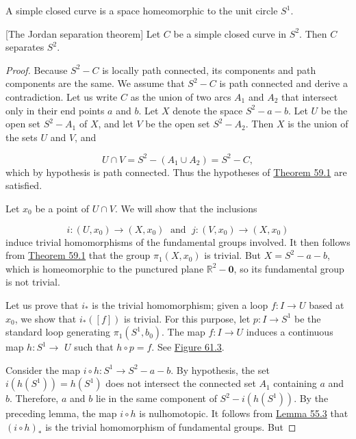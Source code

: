 A simple closed curve is a space homeomorphic to the unit circle \(S^{1}\).

\begin{theorem}
\label{thm:\thetheorem}[The Jordan separation theorem]
Let \(C\) be a simple closed curve in \(S^{2}\). Then \(C\) separates \(S^{2}\).
\end{theorem}

\begin{proof}
Because \(S^{2} - C\) is locally path connected, its components and path components are the same. We assume that \(S^{2} - C\) is path connected and derive a contradiction.
Let us write \(C\) as the union of two arcs \(A_{1}\) and \(A_{2}\) that intersect only in their end points \(a\) and \(b\). Let \(X\) denote the space \(S^{2} - a - b\). Let \(U\) be the open set \(S^{2} - A_{1}\) of \(X\), and let \(V\) be the open set \(S^{2} - A_{2}\). Then \(X\) is the union of the sets \(U\) and \(V\), and

\[
U \cap V = S^{2} - ( {A_{1} \cup {A}_{2}}) = S^{2} - C,
\]
which by hypothesis is path connected. Thus the hypotheses of \hyperref[thm:59.1]{Theorem 59.1} are satisfied.

Let \(x_{0}\) be a point of \(U \cap V\). We will show that the inclusions

\[
i : ( {U,x_{0}}) \rightarrow ( {X,x_{0}}) \;\text{ and }\;j : ( {V,x_{0}}) \rightarrow ( {X,x_{0}})
\]
induce trivial homomorphisms of the fundamental groups involved. It then follows from \hyperref[thm:59.1]{Theorem 59.1} that the group \({\pi }_{1}( {X,x_{0}})\) is trivial. But \(X = S^{2} - a - b\), which is homeomorphic to the punctured plane \(\mathbb{R}^{2} - \mathbf{0}\), so its fundamental group is not trivial.

Let us prove that \(i_{ * }\) is the trivial homomorphism; given a loop \(f : I \rightarrow U\) based at \(x_{0}\), we show that \(i_{ * }( [ f] )\) is trivial. For this purpose, let \(p : I \rightarrow {S}^{1}\) be the standard loop generating \({\pi }_{1}( {S^{1},b_{0}})\). The map \(f : I \rightarrow U\) induces a continuous map \(h : S^{1} \rightarrow\) \(U\) such that \(h \circ p = f\). See \hyperref[fig:61.3]{Figure 61.3}.

Consider the map \(i \circ h : S^{1} \rightarrow {S}^{2} - a - b\). By hypothesis, the set \(i( {h( S^{1}) }) = h( S^{1})\) does not intersect the connected set \(A_{1}\) containing \(a\) and \(b\). Therefore, \(a\) and \(b\) lie in the same component of \(S^{2} - i( {h( S^{1}) })\). By the preceding lemma, the map \(i \circ h\) is nulhomotopic. It follows from \hyperref[lem:55.3]{Lemma 55.3} that \({( i \circ h) }_{ * }\) is the trivial homomorphism of fundamental groups. But


\end{proof}
